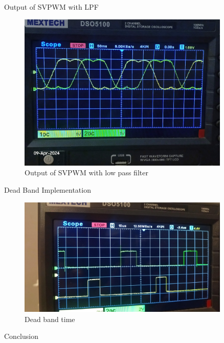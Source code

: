 \begin{frame}{Output of SVPWM with LPF}
	\begin{figure}
		\centering
		\includegraphics[width=0.9\textwidth]{sections/section6/images/SVPWM/SVPWM2phases.jpg}
		\caption{Output of SVPWM with low pass filter}
	\end{figure}
\end{frame}

\begin{frame}{Dead Band Implementation}
	\begin{figure}
		\centering
		\includegraphics[width=0.9\textwidth]{sections/section6/images/SVPWM/DeadBand20Us.jpeg}
		\caption{Dead band time}
	\end{figure}
\end{frame}

\begin{frame}{Conclusion}
\end{frame}

